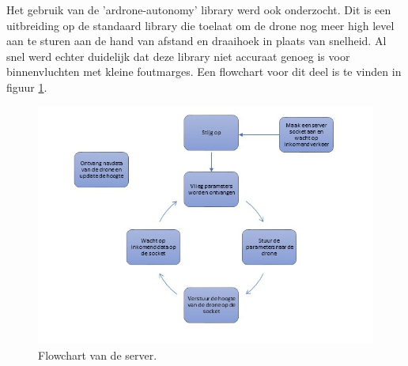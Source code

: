 Het gebruik van de 'ardrone-autonomy' library werd ook onderzocht.
Dit is een uitbreiding op de standaard library die toelaat om de drone nog meer high level aan te sturen aan de hand van afstand en draaihoek in plaats van snelheid.
Al snel werd echter duidelijk dat deze library niet accuraat genoeg is  voor binnenvluchten met kleine foutmarges.
Een flowchart voor dit deel is te vinden in figuur \ref{fig:flowchart_server}.
\begin{figure}[p]
	\centering
	\includegraphics[width=\textwidth]{images/node_server_flowchart}
	\caption[Flowchart van de server]{Flowchart van de server.}
	\label{fig:flowchart_server}
\end{figure}


